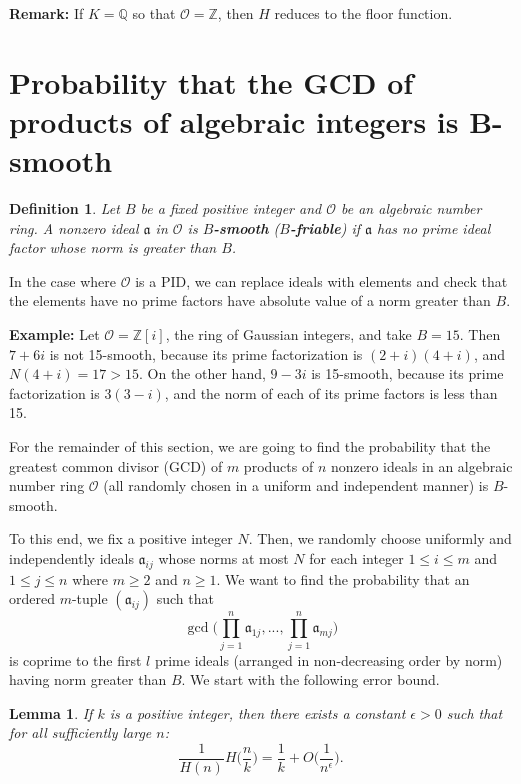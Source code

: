 \documentclass[12pt]{amsart}
\newtheorem{lemma}[theorem]{Lemma}
\newtheorem{definition}[theorem]{Definition}
\theoremstyle{definition}
\begin{document}
\noindent \textbf{Remark:} If $K=\mathbb{Q}$ so that $\mathcal{O} = \mathbb{Z}$, then $H$ reduces to the floor function. 

\section{Probability that the GCD of products of algebraic integers is B-smooth}

\begin{definition} Let $B$ be a fixed positive integer and $\mathcal{O}$ be an algebraic number ring. A nonzero ideal $\mathfrak{a}$ in $\mathcal{O}$ is \textbf{$B$-smooth} (\textbf{$B$-friable}) if $\mathfrak{a}$ has no prime ideal factor whose norm is greater than $B$. 
\end{definition}

In the case where $\mathcal{O}$ is a PID, we can replace ideals with elements and check that the elements have no prime factors have absolute value of a norm greater than $B$.

\noindent \textbf{Example:} Let $\mathcal{O} = \mathbb{Z}[i]$, the ring of Gaussian integers, and take $B =  15$. Then $7 + 6i$ is not 15-smooth, because its prime factorization is $(2+i)(4+i)$, and $N(4+i) = 17 > 15$. On the other hand, $9-3i$ is 15-smooth, because its prime factorization is $3(3 - i)$, and the norm of each of its prime factors is less than 15.

For the remainder of this section, we are going to find the probability that the greatest common divisor (GCD) of $m$ products of $n$ nonzero ideals in an algebraic number ring $\mathcal{O}$ (all randomly chosen in a uniform and independent manner) is $B$-smooth. 

\vspace{.1 in}

To this end, we fix a positive integer $N$. Then, we randomly choose uniformly and independently ideals $\mathfrak{a}_{ij}$ whose norms at most $N$ for each integer $1 \leq i \leq m$ and $1 \leq j \leq n$ where $m \geq 2$ and $n \geq 1$. We want to find the probability that an ordered $m$-tuple $(\mathfrak{a}_{ij})$ such that 
$$\gcd\Big(\prod_{j=1}^n \mathfrak{a}_{1j}, ..., \prod_{j=1}^n \mathfrak{a}_{mj}\Big)$$
is coprime to the first $l$ prime ideals (arranged in non-decreasing order by norm) having norm greater than $B$. We start with the following error bound.

\begin{lemma}\label{H-estimate-frac} If $k$ is a positive integer, then there exists a constant $\epsilon > 0$ such that for all sufficiently large $n$:
	$$\frac{1}{H(n)} H\Big(\frac{n}{k}\Big) = \frac{1}{k} + O\Big(\frac{1}{n^{\epsilon}}\Big).$$
\end{lemma}
\end{document}
